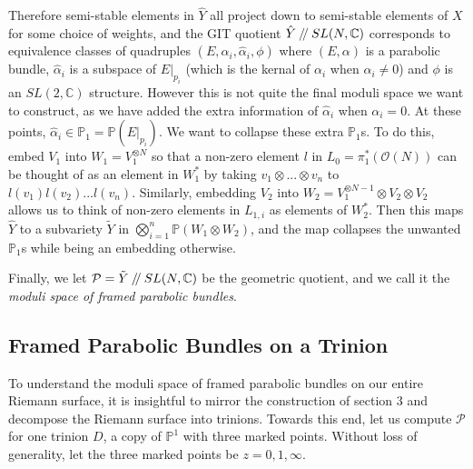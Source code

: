 \documentclass[]{article}
\newcommand{\C}{\mathbb{C}}
\newcommand{\OO}{\mathcal{O}}
\newcommand{\cP}{\mathcal{P}}
\newcommand{\PP}{\mathbb{P}}
\newcommand{\sslash}{\mathbin{/\mkern-4mu/}}
\begin{document}
	Therefore semi-stable elements in $\hat{Y}$ all project down to semi-stable elements of $X$ for some choice of weights, and the GIT quotient $\hat{Y}\sslash SL(N,\C)$ corresponds to equivalence classes of quadruples $(E,\alpha_i, \hat{\alpha}_i, \phi)$ where $(E,\alpha)$ is a parabolic bundle, $\hat{\alpha}_i$ is a subspace of $E|_{p_i}$ (which is the kernal of $\alpha_i$ when $\alpha_i \neq 0$) and $\phi$ is an $SL(2,\C)$ structure. However this is not quite the final moduli space we want to construct, as we have added the extra information of $\hat{\alpha}_i$ when $\alpha_i = 0$. At these points, $\hat{\alpha}_i \in \PP_1=\PP(E|_{p_i})$. We want to collapse these extra $\PP_1$s. To do this, embed $V_1$ into $W_1 = V_1^{\otimes N}$ so that a non-zero element $l$ in $L_{0} = \pi_1^\ast(\OO(N))$ can be thought of as an element in $W_1^\ast$ by taking $v_1\otimes...\otimes v_n$ to $l(v_1)l(v_2)...l(v_n)$. Similarly, embedding $V_2$ into $W_2 = V_1^{\otimes N-1}\otimes V_2\otimes V_2$ allows us to think of non-zero elements in $L_{1,i}$ as elements of $W_2^\ast$. Then this maps $\hat{Y}$ to a subvariety $\tilde{Y}$ in $\bigotimes_{i=1}^n \PP(W_1\otimes W_2)$, and the map collapses the unwanted $\PP_1$s while being an embedding otherwise. 
	
	Finally, we let $\cP = \tilde{Y}\sslash SL(N,\C)$ be the geometric quotient, and we call it the \emph{moduli space of framed parabolic bundles}.
	
	\subsection{Framed Parabolic Bundles on a Trinion}
	To understand the moduli space of framed parabolic bundles on our entire Riemann surface, it is insightful to mirror the construction of section 3 and decompose the Riemann surface into trinions. Towards this end, let us compute $\cP$ for one trinion $D$, a copy of $\PP^1$ with three marked points. Without loss of generality, let the three marked points be $z=0,1,\infty$. 
	
\end{document}
